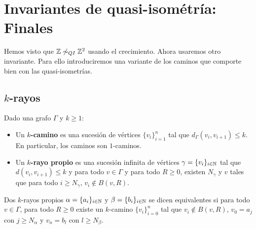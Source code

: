 \documentclass[twoside, 11pt]{article}
\begin{document}
\section{Invariantes de quasi-isométría: Finales}
Hemos visto que $\mathbb{Z}\not\sim_{QI}\mathbb{Z}^2$ usando el crecimiento. Ahora usaremos otro invariante. Para ello introduciremos una variante de los caminos que comporte bien con las quasi-isometrías. 
\subsection{$k$-rayos}
\begin{defi}
Dado una grafo $\Gamma$ y $k\geq 1$:
\begin{itemize}
\item Un \textbf{$k$-camino} es una sucesión de vértices $\{v_i\}_{i=1}^n$ tal que $d_\Gamma(v_i,v_{i+1})\leq k$. En particular, los caminos son $1$-caminos.
\item Un \textbf{$k$-rayo propio} es una sucesión infinita de vértices $\gamma=\{v_i\}_{i\in\mathbb{N}}$ tal que $d(v_i,v_{i+1})\leq k$ y para todo $v\in \Gamma$ y para todo $R\geq 0$, existen $N_\gamma$ y $v$ tales que para todo $i\geq N_\gamma$, $v_i\notin B(v,R)$.  
\end{itemize}
Dos $k$-rayos propios $\alpha=\{a_i\}_{i\in \mathbb{N}}$ y $\beta=\{b_i\}_{i\in\mathbb{N}}$ se dicen equivalentes si para todo $v\in\Gamma$, para todo $R\geq 0$ existe un $k$-camino $\{v_i\}_{i=0}^n$ tal que $v_i\notin B(v,R)$, $v_0=a_j$ con $j\geq N_\alpha$ y $v_n=b_l$ con $l\geq N_\beta$.
\end{defi}
\end{document}
